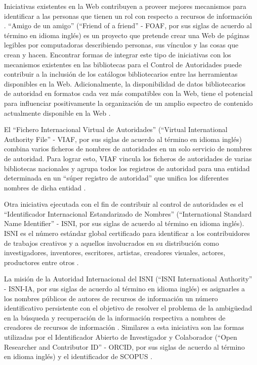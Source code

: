 Iniciativas existentes en la Web contribuyen a proveer mejores mecanismos para identificar a las personas que tienen un rol con respecto a recursos de información \citep{Harper2007}. ``Amigo de un amigo'' (``Friend of a friend'' - FOAF, por sus siglas de acuerdo al término en idioma inglés) es un proyecto que pretende crear una Web de páginas legibles por computadoras describiendo personas, sus vínculos y las cosas que crean y hacen. Encontrar formas de integrar este tipo de iniciativas con los mecanismos existentes en las bibliotecas para el Control de Autoridades puede contribuir a la inclusión de los catálogos bibliotecarios entre las herramientas disponibles en la Web. Adicionalmente, la disponibilidad de datos bibliotecarios de autoridad en formatos cada vez más compatibles con la Web, tiene el potencial para influenciar positivamente la organización de un amplio espectro de contenido actualmente disponible en la Web \citep{Harper2007}.

El ``Fichero Internacional Virtual de Autoridades'' (``Virtual International Authority File'' - VIAF, por sus siglas de acuerdo al término en idioma inglés) combina varios ficheros de nombres de autoridades en un solo servicio de nombres de autoridad. Para lograr esto, VIAF vincula los ficheros de autoridades de varias bibliotecas nacionales y agrupa todos los registros de autoridad para una entidad determinada en un ``súper registro de autoridad'' que unifica los diferentes nombres de dicha entidad \citep{OCLCOnlineComputerLibraryCenterInc.2014}.

Otra iniciativa ejecutada con el fin de contribuir al control de autoridades es el ``Identificador Internacional Estandarizado de Nombres'' (``International Standard Name Identifier'' - ISNI, por sus siglas de acuerdo al término en idioma inglés). ISNI es el número estándar global certificado para identificar a los contribuidores de trabajos creativos y a aquellos involucrados en su distribución como investigadores, inventores, escritores, artistas, creadores visuales, actores, productores entre otros \citep{ISNIInternationalStandardNameIdentifier2017}.

La misión de la Autoridad Internacional del ISNI (``ISNI International Authority'' - ISNI-IA, por sus siglas de acuerdo al término en idioma inglés) es asignarles a los nombres públicos de autores de recursos de información un número identificativo persistente con el objetivo de resolver el problema de la ambigüedad en la búsqueda y recuperación de la información respectiva a nombres de creadores de recursos de información \citep{ISNIInternationalStandardNameIdentifier2017}. Similares a esta iniciativa son las formas utilizadas por el Identificador Abierto de Investigador y Colaborador (``Open Researcher and Contributor ID'' - ORCID, por sus siglas de acuerdo al término en idioma inglés) \citep{ORCID2017} y el identificador de SCOPUS \citep{Elsevier2016}.

